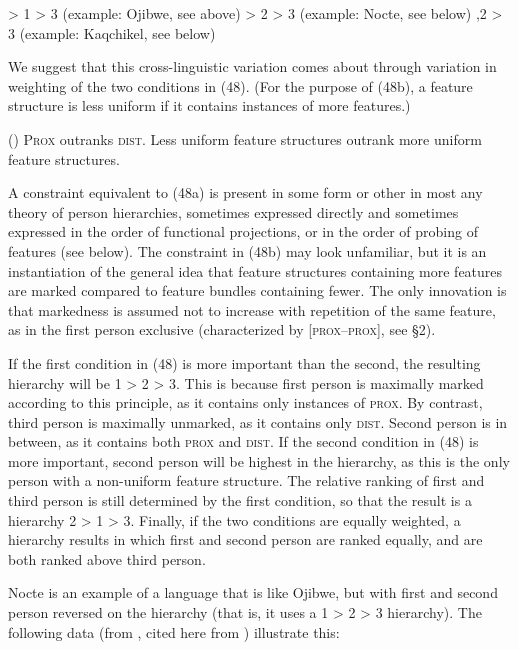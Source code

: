 \documentclass[output=paper]{langsci/langscibook}
\begin{document}
\ea 
{} > 1 > 3  (example: Ojibwe, see above)
 > 2 > 3   (example: Nocte, see below)
,2 > 3  (example: Kaqchikel, see below)
\z
\z

We suggest that this cross-linguistic variation comes about through variation in weighting of the two conditions in (48). (For the purpose of (48b), a feature structure is less uniform if it contains instances of more features.)

\ea (\label{bkm:Ref453928502})  
\ea  \textsc{Prox} outranks \textsc{dist}.
\ex  Less uniform feature structures outrank more uniform feature structures.
\z
\z

A constraint equivalent to (48a) is present in some form or other in most any theory of person hierarchies, sometimes expressed directly and sometimes expressed in the order of functional projections, or in the order of probing of features (see below). The constraint in (48b) may look unfamiliar, but it is an instantiation of the general idea that feature structures containing more features are marked compared to feature bundles containing fewer. The only innovation is that markedness is assumed not to increase with repetition of the same feature, as in the first person exclusive (characterized by [\textsc{prox}–\textsc{prox}], see §2).

If the first condition in (48) is more important than the second, the resulting hierarchy will be 1 > 2 > 3. This is because first person is maximally marked according to this principle, as it contains only instances of \textsc{prox}. By contrast, third person is maximally unmarked, as it contains only \textsc{dist}. Second person is in between, as it contains both \textsc{prox} and \textsc{dist}. If the second condition in (48) is more important, second person will be highest in the hierarchy, as this is the only person with a non-uniform feature structure. The relative ranking of first and third person is still determined by the first condition, so that the result is a hierarchy 2 > 1 > 3. Finally, if the two conditions are equally weighted, a hierarchy results in which first and second person are ranked equally, and are both ranked above third person.

Nocte is an example of a language that is like Ojibwe, but with first and second person reversed on the hierarchy (that is, it uses a 1 > 2 > 3 hierarchy). The following data (from \citealt[641]{DeLancey1981}, cited here from \citealt[172]{Croft2003}) illustrate this:
\end{document}
